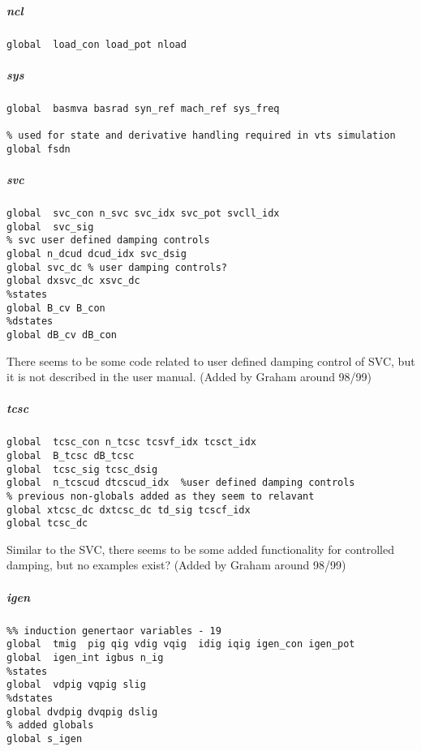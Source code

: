 \documentclass[12pt]{article}
\begin{document}
\subparagraph{ncl}
\begin{verbatim}
global  load_con load_pot nload
\end{verbatim}
\subparagraph{sys}
\begin{verbatim}
global  basmva basrad syn_ref mach_ref sys_freq

% used for state and derivative handling required in vts simulation
global fsdn 
\end{verbatim}

\subparagraph{svc}
\begin{verbatim}
global  svc_con n_svc svc_idx svc_pot svcll_idx
global  svc_sig
% svc user defined damping controls
global n_dcud dcud_idx svc_dsig
global svc_dc % user damping controls?
global dxsvc_dc xsvc_dc
%states
global B_cv B_con
%dstates
global dB_cv dB_con
\end{verbatim}
There seems to be some code related to user defined damping control of SVC, but it is not described in the user manual. 
(Added by Graham around 98/99)


\subparagraph{tcsc}
\begin{verbatim}
global  tcsc_con n_tcsc tcsvf_idx tcsct_idx
global  B_tcsc dB_tcsc
global  tcsc_sig tcsc_dsig
global  n_tcscud dtcscud_idx  %user defined damping controls
% previous non-globals added as they seem to relavant
global xtcsc_dc dxtcsc_dc td_sig tcscf_idx 
global tcsc_dc
\end{verbatim}
Similar to the SVC, there seems to be some added functionality for controlled damping, but no examples exist? (Added by Graham around 98/99)

\subparagraph{igen}
\begin{verbatim}
%% induction genertaor variables - 19
global  tmig  pig qig vdig vqig  idig iqig igen_con igen_pot
global  igen_int igbus n_ig
%states
global  vdpig vqpig slig
%dstates
global dvdpig dvqpig dslig
% added globals
global s_igen
\end{verbatim}
\end{document}
